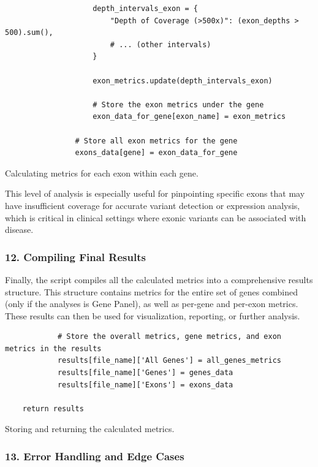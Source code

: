 \begin{longlisting}
\begin{verbatim}
                    depth_intervals_exon = {
                        "Depth of Coverage (>500x)": (exon_depths > 500).sum(),
                        # ... (other intervals)
                    }

                    exon_metrics.update(depth_intervals_exon)

                    # Store the exon metrics under the gene
                    exon_data_for_gene[exon_name] = exon_metrics

                # Store all exon metrics for the gene
                exons_data[gene] = exon_data_for_gene
\end{verbatim}
\caption{Calculating metrics for each exon within each gene.}
\label{lbl:metrics_exon}
\end{longlisting}

This level of analysis is especially useful for pinpointing specific exons that may have insufficient coverage for accurate variant detection or expression analysis, which is critical in clinical settings where exonic variants can be associated with disease.

\subsubsection{\textbf{12. Compiling Final Results}}

Finally, the script compiles all the calculated metrics into a comprehensive results structure. This structure contains metrics for the entire set of genes combined (only if the analyses is Gene Panel), as well as per-gene and per-exon metrics. These results can then be used for visualization, reporting, or further analysis.

\begin{longlisting}
\begin{verbatim}
            # Store the overall metrics, gene metrics, and exon metrics in the results
            results[file_name]['All Genes'] = all_genes_metrics
            results[file_name]['Genes'] = genes_data
            results[file_name]['Exons'] = exons_data

    return results
\end{verbatim}
\caption{Storing and returning the calculated metrics.}
\label{lbl:metrics_results}
\end{longlisting}

\subsubsection{\textbf{13. Error Handling and Edge Cases}}

